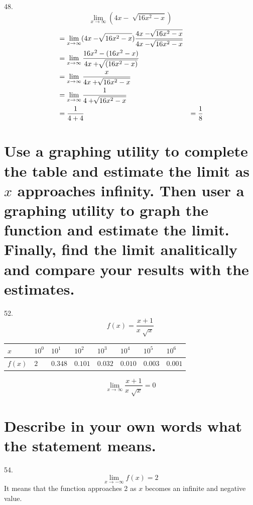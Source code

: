 \documentclass[11pt]{article}
\newcommand*{\set}{\setcounter{equation}{0}}
\begin{document}
48.\[\lim_{x\to\infty}(4x-\sqrt[]{16x^2-x})\]
\begin{align}
    \set
    &=\lim_{x\to\infty}(4x-\sqrt[]{16x^2-x})\frac{4x-\sqrt[]{16x^2-x}}{4x-\sqrt[]{16x^2-x}}\\
    &=\lim_{x\to\infty}\frac{16x^2-(16x^2-x)}{4x+\sqrt[]{(16x^2-x)}}\\
    &=\lim_{x\to\infty}\frac{x}{4x+\sqrt[]{16x^2-x}}\\
    &=\lim_{x\to\infty}\frac{1}{4+\sqrt[]{16x^2-x}}\\
    &=\frac{1}{4+4}
    &=\frac{1}{8}
\end{align}

\section{Use a graphing utility to complete the table and estimate the limit as $x$ approaches infinity. Then user a graphing utility to graph the function and estimate the limit. Finally, find the limit analitically and compare your results with the estimates.}
52.\[f(x)=\frac{x+1}{x\sqrt[]{x}}\]
\begin{flushleft}
    \begin{table}[h]
        \begin{tabular}{|l|l|l|l|l|l|l|l|}
        \hline
        $x$ & $10^0$ & $10^1$ & $10^2$ & $10^3$ & $10^4$ & $10^5$ & $10^6$\\ \hline
        $f(x)$ & $2$ & $0.348$ & $0.101$ & $0.032$ & $0.010$ & $0.003$ & $0.001$\\ \hline
        \end{tabular}
    \end{table}
\end{flushleft}
\[\lim_{x\to\infty}\frac{x+1}{x\sqrt[]{x}}=0\]

\section{Describe in your own words what the statement means.}
54.\[\lim_{x\to-\infty}f(x)=2\]
It means that the function approaches 2 as $x$ becomes an infinite and negative value.
\end{document}
